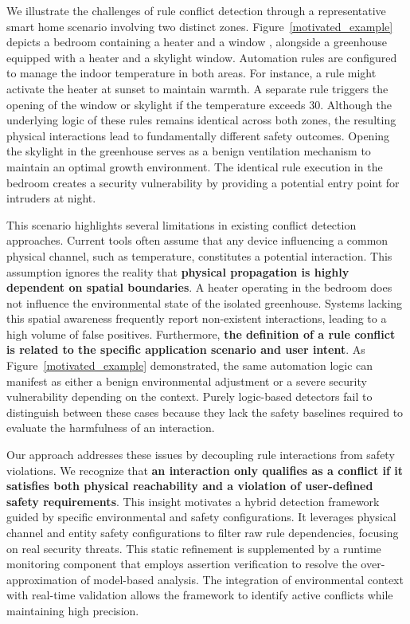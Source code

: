 We illustrate the challenges of rule conflict detection through a representative smart home scenario involving two distinct zones. Figure~\ref{motivated_example} depicts a bedroom containing a heater and a window , alongside a greenhouse equipped with a heater and a skylight window. Automation rules are configured to manage the indoor temperature in both areas. For instance, a rule might activate the heater at sunset to maintain warmth. A separate rule triggers the opening of the window or skylight if the temperature exceeds 30\celsius. Although the underlying logic of these rules remains identical across both zones, the resulting physical interactions lead to fundamentally different safety outcomes. Opening the skylight in the greenhouse serves as a benign ventilation mechanism to maintain an optimal growth environment. The identical rule execution in the bedroom creates a security vulnerability by providing a potential entry point for intruders at night.

This scenario highlights several limitations in existing conflict detection approaches. Current tools often assume that any device influencing a common physical channel, such as temperature, constitutes a potential interaction. This assumption ignores the reality that \textbf{physical propagation is highly dependent on spatial boundaries}. A heater operating in the bedroom does not influence the environmental state of the isolated greenhouse. Systems lacking this spatial awareness frequently report non-existent interactions, leading to a high volume of false positives. Furthermore, \textbf{the definition of a rule conflict is related to the specific application scenario and user intent}. As Figure~\ref{motivated_example} demonstrated, the same automation logic can manifest as either a benign environmental adjustment or a severe security vulnerability depending on the context. Purely logic-based detectors fail to distinguish between these cases because they lack the safety baselines required to evaluate the harmfulness of an interaction.

Our approach addresses these issues by decoupling rule interactions from safety violations. We recognize that \textbf{an interaction only qualifies as a conflict if it satisfies both physical reachability and a violation of user-defined safety requirements}. 
This insight motivates a hybrid detection framework guided by specific environmental and safety configurations. It leverages physical channel and entity safety configurations to filter raw rule dependencies, focusing on real security threats. This static refinement is supplemented by a runtime monitoring component that employs assertion verification to resolve the over-approximation of model-based analysis. The integration of environmental context with real-time validation allows the framework to identify active conflicts while maintaining high precision.

